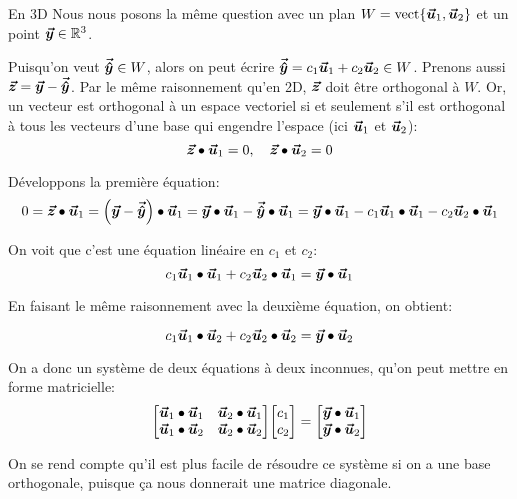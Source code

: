 \documentclass[a4paper]{article}
\begin{document}
\begin{parag}{En 3D}
    Nous nous posons la même question avec un plan $W = \vect\left\{\bvec{u}_1, \bvec{u}_2\right\}$ et un point $\bm{\protect\vec{y}} \in \mathbb{R}^3$.

    Puisqu'on veut $\bm{\protect\vec{\hat{y}}} \in W$, alors on peut écrire $\bm{\protect\vec{\hat{y}}} = c_1 \bm{\protect\vec{u}}_1 + c_2 \bm{\protect\vec{u}}_2 \in W$. Prenons aussi $\bm{\protect\vec{z}} = \bm{\protect\vec{y}} - \bm{\protect\vec{\hat{y}}}$. Par le même raisonnement qu'en 2D, $\bm{\protect\vec{z}}$ doit être orthogonal à $W$. Or, un vecteur est orthogonal à un espace vectoriel si et seulement s'il est orthogonal à tous les vecteurs d'une base qui engendre l'espace (ici $\bm{\protect\vec{u}}_1$ et $\bm{\protect\vec{u}}_2$):
    \[\bm{\protect\vec{z}} \bullet \bm{\protect\vec{u}}_1 = 0, \quad \bm{\protect\vec{z}} \bullet \bm{\protect\vec{u}}_2 = 0\]

    Développons la première équation:
    \[0 = \bvec{z} \dotprod \bvec{u}_1 = \left(\bvec{y} - \bvec{\hat{y}}\right) \dotprod \bvec{u}_1 = \bvec{y} \dotprod \bvec{u}_1 - \bvec{\hat{y}} \dotprod \bvec{u}_1 = \bvec{y} \dotprod \bvec{u}_1 - c_1 \bvec{u}_1 \dotprod \bvec{u}_1 - c_2 \bvec{u}_2 \dotprod \bvec{u}_1\]

    On voit que c'est une équation linéaire en $c_1$ et $c_2$:
    \[c_1 \bm{\protect\vec{u}}_1 \bullet \bm{\protect\vec{u}}_1 + c_2 \bm{\protect\vec{u}}_2 \bullet \bm{\protect\vec{u}}_1 = \bm{\protect\vec{y}} \bullet \bm{\protect\vec{u}}_1\]

    En faisant le même raisonnement avec la deuxième équation, on obtient:

    \[c_1 \bm{\protect\vec{u}}_1 \bullet \bm{\protect\vec{u}}_2 + c_2 \bm{\protect\vec{u}}_2 \bullet \bm{\protect\vec{u}}_2 = \bm{\protect\vec{y}} \bullet \bm{\protect\vec{u}}_2\]

    On a donc un système de deux équations à deux inconnues, qu'on peut mettre en forme matricielle:
    \[\begin{bmatrix} \bvec{u}_1 \dotprod \bvec{u}_1 & \bvec{u}_2 \dotprod \bvec{u}_1 \\ \bvec{u}_1 \dotprod \bvec{u}_2 & \bvec{u}_2 \dotprod \bvec{u}_2 \end{bmatrix} \begin{bmatrix} c_1 \\ c_2 \end{bmatrix} = \begin{bmatrix} \bvec{y} \dotprod \bvec{u}_1 \\ \bvec{y} \dotprod \bvec{u}_2 \end{bmatrix}  \]

    On se rend compte qu'il est plus facile de résoudre ce système si on a une base orthogonale, puisque ça nous donnerait une matrice diagonale.
\end{parag}
\end{document}
